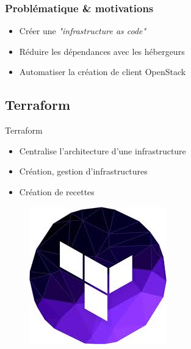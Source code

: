 \documentclass[11pt]{beamer} %
\begin{document}
		
			\begin{frame}
				\frametitle{Problématique \& motivations}
				\begin{itemize}
					\item Créer une \textit{"infrastructure as code"}
					\item Réduire les dépendances avec les hébergeurs
					\item Automatiser la création de client OpenStack
				\end{itemize}
			\end{frame}
			
		\subsection{Terraform}
			\begin{frame}{Terraform}
			\begin{itemize}
			\item Centralise l'architecture d'une infrastructure
			\item Création, gestion d'infrastructures
			\item Création de recettes
			\end{itemize}
			\begin{figure}
				\begin{center}
					\includegraphics[scale=0.3]{logoTerraform.jpg}
				\end{center}
			\end{figure}
			\end{frame}
		
		
\end{document}
